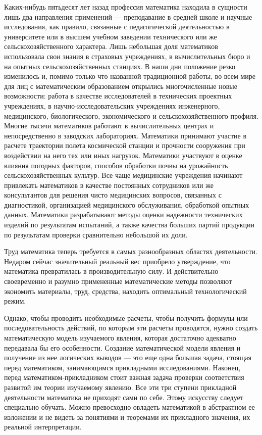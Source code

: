 \documentclass[12pt, a4paper, openany]{book}
\begin{document}
Каких-нибудь пятьдесят лет назад профессия математика находила в сущности лишь два направления применений —  преподавание в средней школе и научные исследования, как правило, связанные с педагогической деятельностью в университете или в высшем учебном заведении технического или же сельскохозяйственного характера. Лишь небольшая доля математиков использовала свои знания в страховых учреждениях, в вычислительных бюро и на опытных сельскохозяйственных станциях. В наши дни положение резко изменилось и, помимо только что названной традиционной работы, во всем мире для лиц с  математическим образованием открылись многочисленные новые возможности: работа в качестве исследователей в технических проектных учреждениях, в  научно-исследовательских учреждениях инженерного, медицинского, биологического, экономического и сельскохозяйственного профиля. Многие тысячи математиков работают в вычислительных центрах и непосредственно в заводских лабораториях. Математики принимают участие в расчете траектории полета космической станции и прочности сооружения при воздействии на него тех или иных нагрузок. Математики участвуют в оценке влияния погодных факторов,  способов обработки почвы на урожайность сельскохозяйственных культур. Все чаще медицинские учреждения начинают привлекать математиков в качестве постоянных сотрудников или же консультантов для решения чисто медицинских вопросов, связанных с диагностикой, организацией медицинского обслуживания, обработкой опытных данных. Математики разрабатывают методы оценки надежности технических изделий по результатам испытаний, а также качества больших партий продукции по результатам проверки сравнительно небольшой их доли. 

Труд математика теперь требуется в самых разнообразных областях деятельности. Недаром сейчас значительный реальный вес приобрело утверждение, что математика превратилась в производительную силу. И действительно своевременно и разумно примененные математические методы позволяют экономить материалы, труд, средства, находить оптимальный технологический режим. 

Однако, чтобы проводить необходимые расчеты, чтобы получить формулы или последовательность действий, по которым эти расчеты проводятся, нужно создать  математическую модель изучаемого явления, которая достаточно адекватно передавала бы его особенности. Создание математической модели явления и получение из нее логических выводов — это еще одна большая задача, стоящая перед математиком, занимающимся прикладными исследованиями. Наконец, перед математиком-прикладником стоит важная задача проверки соответствия развитой им теории изучаемому явлению. Все эти три ступени прикладной деятельности математика не приходят сами по себе. Этому искусству следует специально обучать. Можно превосходно овладеть математикой в абстрактном ее изложении и не видеть за понятиями и теоремами их прикладного значения, их реальной интерпретации. 
\end{document}

